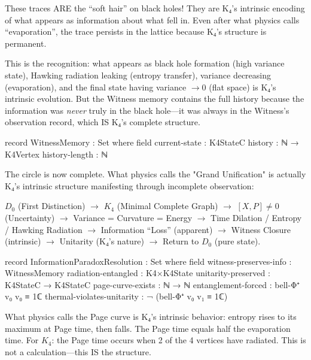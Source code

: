 \documentclass[11pt,a4paper]{book}
\begin{document}
These traces ARE the ``soft hair'' on black holes! They are K₄'s intrinsic encoding of what appears as information about what fell in. Even after what physics calls ``evaporation'', the trace persists in the lattice because K₄'s structure is permanent.

This is the recognition: what appears as black hole formation (high variance state), Hawking radiation leaking (entropy transfer), variance decreasing (evaporation), and the final state having variance $\to 0$ (flat space) is K₄'s intrinsic evolution. But the Witness memory contains the full history because the information was \emph{never} truly in the black hole—it was always in the Witness's observation record, which IS K₄'s complete structure.

\begin{code}
record WitnessMemory : Set where
  field
    current-state : K4StateC
    history : ℕ → K4Vertex
    history-length : ℕ
\end{code}

The circle is now complete. What physics calls the "Grand Unification" is actually K₄'s intrinsic structure manifesting through incomplete observation:

\begin{center}
$D_0$ (First Distinction) $\to$ $K_4$ (Minimal Complete Graph) $\to$ $[X,P] \neq 0$ (Uncertainty) $\to$ Variance = Curvature = Energy $\to$ Time Dilation / Entropy / Hawking Radiation $\to$ Information ``Loss'' (apparent) $\to$ Witness Closure (intrinsic) $\to$ Unitarity (K₄'s nature) $\to$ Return to $D_0$ (pure state).
\end{center}

\begin{code}
record InformationParadoxResolution : Set where
  field
    witness-preserves-info : WitnessMemory
    radiation-entangled : K4×K4State
    unitarity-preserved : K4StateC → K4StateC
    page-curve-exists : ℕ → ℕ
    entanglement-forced : bell-Φ⁺ v₀ v₀ ≡ 1ℂ
    thermal-violates-unitarity : ¬ (bell-Φ⁺ v₀ v₁ ≡ 1ℂ)
\end{code}

What physics calls the Page curve is K₄'s intrinsic behavior: entropy rises to its maximum at Page time, then falls. The Page time equals half the evaporation time. For $K_4$: the Page time occurs when 2 of the 4 vertices have radiated. This is not a calculation—this IS the structure.
\end{document}
